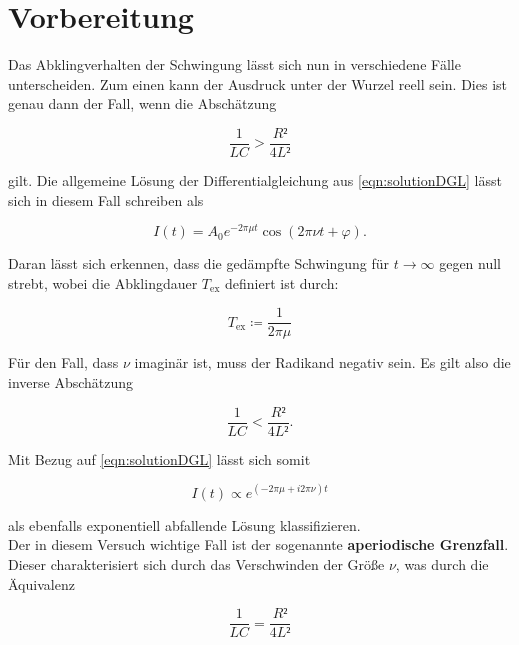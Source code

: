 \section{Vorbereitung}

Das Abklingverhalten der Schwingung lässt sich nun in verschiedene Fälle unterscheiden. Zum einen kann der Ausdruck 
unter der Wurzel reell sein. Dies ist genau dann der Fall, wenn die Abschätzung

\begin{equation}
\label{eqn:reell}
    \frac{1}{LC} > \frac{R²}{4L²}
\end{equation}

\noindent gilt. Die allgemeine Lösung der Differentialgleichung aus \eqref{eqn:solutionDGL} lässt sich in diesem Fall 
schreiben als

\begin{equation*}
    I(t) = A_0e^{-2\pi\mu{}t}\cos\left(2\pi\nu{}t + \varphi\right).
\end{equation*}

\noindent Daran lässt sich erkennen, dass die gedämpfte Schwingung für $t \rightarrow \infty$ gegen null strebt, wobei
die Abklingdauer $T_\text{ex}$ definiert ist durch:

\begin{equation}
    T_\text{ex} \coloneqq \frac{1}{2\pi\mu}
    \label{eqn:abklingdauer}
\end{equation}

\noindent Für den Fall, dass $\nu$ imaginär ist, muss der Radikand negativ sein. Es gilt also die inverse Abschätzung 

\begin{equation}
\label{eqn:imaginaer}
    \frac{1}{LC} < \frac{R²}{4L²}.
\end{equation}

\noindent Mit Bezug auf \eqref{eqn:solutionDGL} lässt sich somit 

\begin{equation*}
    I(t) \propto e^{\left(-2\pi\mu + i2\pi\nu\right)t}
\end{equation*}

\noindent als ebenfalls exponentiell abfallende Lösung klassifizieren.\\
Der in diesem Versuch wichtige Fall ist der sogenannte \textbf{aperiodische Grenzfall}. Dieser charakterisiert sich durch 
das Verschwinden der Größe $\nu$, was durch die Äquivalenz 

\begin{equation}
\label{eqn:Grenzfall}
    \frac{1}{LC} = \frac{R²}{4L²}
\end{equation}

